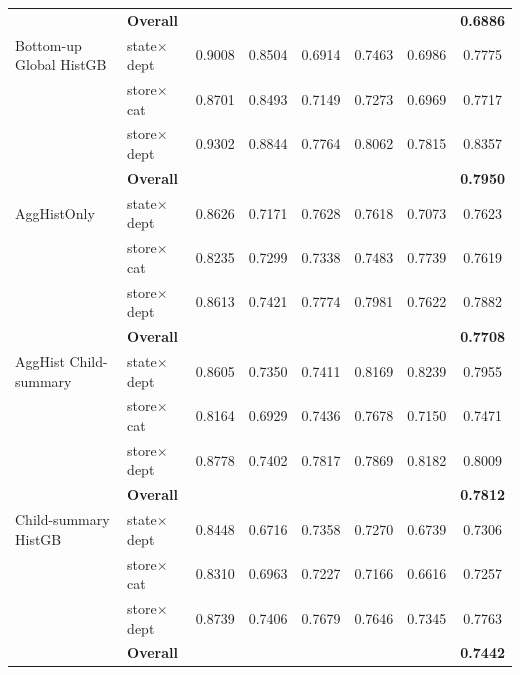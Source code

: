 \documentclass[12pt]{article}
\begin{document}
\begin{table}[H]
\begin{threeparttable}
\begin{tabular}{llccccc|c}
                                   & {\bf Overall} & & & & & & {\bf 0.6886} \\
      \addlinespace
      Bottom-up Global HistGB      & state$\times$dept      &   0.9008 &   0.8504 &   0.6914 &   0.7463 &   0.6986 &   0.7775 \\
                                   & store$\times$cat       &   0.8701 &   0.8493 &   0.7149 &   0.7273 &   0.6969 &   0.7717 \\
                                   & store$\times$dept      &   0.9302 &   0.8844 &   0.7764 &   0.8062 &   0.7815 &   0.8357 \\
                                   & {\bf Overall} & & & & & & {\bf 0.7950} \\
      \addlinespace
      AggHistOnly                  & state$\times$dept      &   0.8626 &   0.7171 &   0.7628 &   0.7618 &   0.7073 &   0.7623 \\
                                   & store$\times$cat       &   0.8235 &   0.7299 &   0.7338 &   0.7483 &   0.7739 &   0.7619 \\
                                   & store$\times$dept      &   0.8613 &   0.7421 &   0.7774 &   0.7981 &   0.7622 &   0.7882 \\
                                   & {\bf Overall} & & & & & & {\bf 0.7708} \\
      \addlinespace
      AggHist Child-summary        & state$\times$dept      &   0.8605 &   0.7350 &   0.7411 &   0.8169 &   0.8239 &   0.7955 \\
                                   & store$\times$cat       &   0.8164 &   0.6929 &   0.7436 &   0.7678 &   0.7150 &   0.7471 \\
                                   & store$\times$dept      &   0.8778 &   0.7402 &   0.7817 &   0.7869 &   0.8182 &   0.8009 \\
                                   & {\bf Overall} & & & & & & {\bf 0.7812} \\
      \addlinespace
      Child-summary HistGB         & state$\times$dept      &   0.8448 &   0.6716 &   0.7358 &   0.7270 &   0.6739 &   0.7306 \\
                                   & store$\times$cat       &   0.8310 &   0.6963 &   0.7227 &   0.7166 &   0.6616 &   0.7257 \\
                                   & store$\times$dept      &   0.8739 &   0.7406 &   0.7679 &   0.7646 &   0.7345 &   0.7763 \\
                                   & {\bf Overall} & & & & & & {\bf 0.7442} \\

\end{tabular}
\end{threeparttable}
\end{table}
\end{document}
